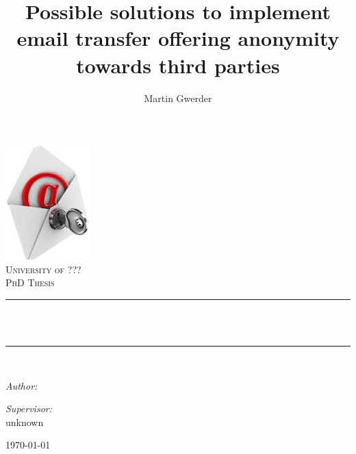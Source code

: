 \documentclass[11pt,a4paper]{book}
\title{Possible solutions to implement email transfer offering anonymity towards third parties}
\author{Martin Gwerder}
\date{\SVNDate}
\begin{document}
\frontmatter

\begin{titlepage}
\pagecolor{orange}\afterpage{\nopagecolor}
\begin{center}
\includegraphics[height=0.4\textwidth]{./inc/logo}~\\[1cm]

\textsc{\LARGE University of ???}\\[1.5cm]

\textsc{\Large PhD Thesis}\\[0.5cm]

\newcommand{\HRule}{\rule{\linewidth}{0.5mm}}
\HRule \\[0.4cm]
{ \huge \bfseries \makeatletter\@title\makeatother \\[0.4cm] }

\HRule \\[1.5cm]

\begin{minipage}{0.6\textwidth}
\begin{flushleft} \large
\emph{Author:}\\
 \makeatletter\@author\makeatother
\end{flushleft}
\end{minipage}
\begin{minipage}{0.6\textwidth}
\begin{flushright} \large
\emph{Supervisor:} \\
 unknown
\end{flushright}
\end{minipage}

\vfill

{\large \today}

\end{center}
\end{titlepage}

\end{document}
